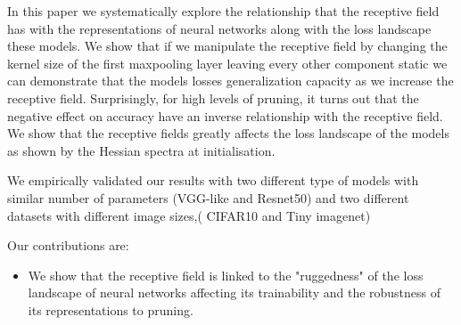 In this paper we systematically explore the relationship that the receptive field has with the representations of neural networks
along with the loss landscape these models. We show that if we manipulate the receptive field by changing the kernel
size of the first maxpooling layer leaving every other component static we can demonstrate that the models losses
generalization capacity as we increase the receptive field. Surprisingly, for high levels of pruning, it turns out
that the negative effect on accuracy have an inverse relationship with the receptive field. We show that the
receptive fields greatly affects the loss landscape of the models as shown by the Hessian spectra at initialisation.

We empirically validated our results with two different type of models  with similar number of parameters (VGG-like and
Resnet50) and two different datasets with different image sizes,( CIFAR10 and Tiny imagenet)

Our contributions are:
\begin{itemize}
  \item We show that the receptive field is linked to the "ruggedness" of the loss landscape of neural networks
    affecting its trainability and the robustness of its representations to pruning.
\end{itemize}


